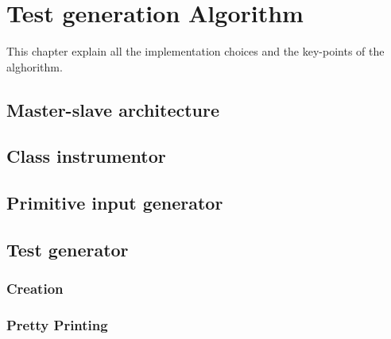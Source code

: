 \chapter{Test generation Algorithm}
This chapter explain all the implementation choices and the key-points of the alghorithm.
\section{Master-slave architecture }
\section{Class instrumentor}
\section{Primitive input generator}
\section{Test generator}
\subsection{Creation}
\subsection{Pretty Printing}
\newpage